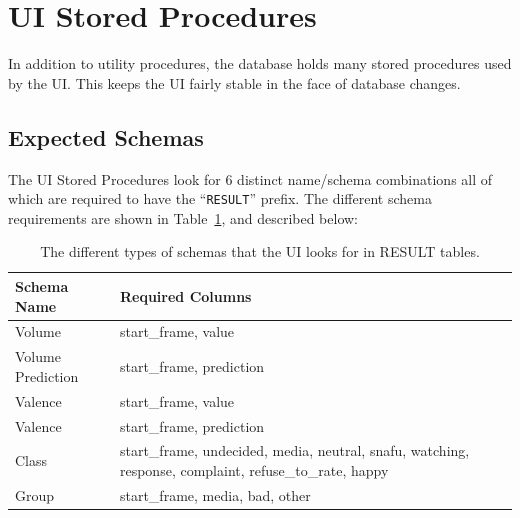 \documentclass[12pt]{ucthesis}
\begin{document}
\section{UI Stored Procedures}
\label{arch-database-sp}
In addition to utility procedures, the database holds many stored procedures used by the UI.
This keeps the UI fairly stable in the face of database changes.

\subsection{Expected Schemas}
\label{arch-database-sp-schemas}
The UI Stored Procedures look for 6 distinct name/schema combinations all of which are required to have the ``\texttt{RESULT}'' prefix.
The different schema requirements are shown in Table~\ref{table:ui-expected-schema}, and described below:

\begin{table}
   \begin{center}
      \begin{tabular}{|l|p{12cm}|}
         \hline
            Schema Name & Required Columns
         \tabularnewline\hline
            Volume & \textsf{start\_frame}, \textsf{value}
         \tabularnewline\hline
            Volume Prediction & \textsf{start\_frame}, \textsf{prediction}
         \tabularnewline\hline
            Valence & \textsf{start\_frame}, \textsf{value}
         \tabularnewline\hline
            Valence & \textsf{start\_frame}, \textsf{prediction}
         \tabularnewline\hline
            Class & \textsf{start\_frame}, \textsf{undecided}, \textsf{media}, \textsf{neutral}, \textsf{snafu}, \textsf{watching}, \textsf{response}, \textsf{complaint}, \textsf{refuse\_to\_rate}, \textsf{happy}
         \tabularnewline\hline
            Group & \textsf{start\_frame}, \textsf{media}, \textsf{bad}, \textsf{other}
         \tabularnewline\hline
      \end{tabular}
   \end{center}
   \caption[Stored Procedure UI Expected Schema]{The different types of schemas that the UI looks for in RESULT tables.}
   \label{table:ui-expected-schema}
\end{table}
\end{document}
